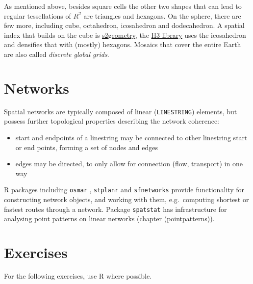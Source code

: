 \documentclass[]{book}
\providecommand{\tightlist}{%
  \setlength{\itemsep}{0pt}\setlength{\parskip}{0pt}}
\begin{document}
As mentioned above, besides square cells the other two shapes
that can lead to regular tessellations of \(R^2\) are triangles
and hexagons. On the sphere, there are few more, including cube,
octahedron, icosahedron and dodecahedron. A spatial index that
builds on the cube is \href{https://s2geometry.io/}{s2geometry}, the
\href{https://eng.uber.com/h3/}{H3 library} uses the icosahedron and
densifies that with (mostly) hexagons. Mosaics that cover the entire
Earth are also called \emph{discrete global grids}.

\hypertarget{networks}{%
\section{Networks}\label{networks}}

Spatial networks are typically composed of linear (\texttt{LINESTRING})
elements, but possess further topological properties describing
the network coherence:

\begin{itemize}
\tightlist
\item
  start and endpoints of a linestring may be connected to other linestring
  start or end points, forming a set of nodes and edges
\item
  edges may be directed, to only allow for connection (flow,
  transport) in one way
\end{itemize}

R packages including \texttt{osmar} \citep{R-osmar}, \texttt{stplanr} \citep{R-stplanr} and
\texttt{sfnetworks} \citep{R-sfnetworks} provide functionality for constructing
network objects, and working with them, e.g.~computing shortest or
fastest routes through a network. Package \texttt{spatstat} \citep{R-spatstat, baddeley2015spatial} has infrastructure for analysing point patterns
on linear networks (chapter \citet{ref}(pointpatterns)).

\hypertarget{exercises-2}{%
\section{Exercises}\label{exercises-2}}

For the following exercises, use R where possible.
\end{document}
